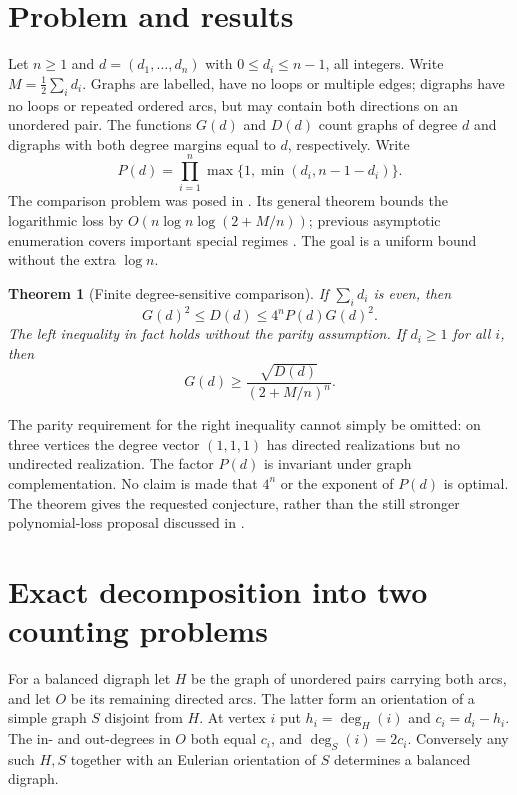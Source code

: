\documentclass[11pt]{article}
\newtheorem{theorem}{Theorem}
\theoremstyle{remark}\newtheorem{remark}[theorem]{Remark}
\begin{document}
\section{Problem and results}
Let $n\ge1$ and $d=(d_1,\ldots,d_n)$ with $0\le d_i\le n-1$, all integers. Write $M=\tfrac12\sum_i d_i$. Graphs are labelled, have no loops or multiple edges; digraphs have no loops or repeated ordered arcs, but may contain both directions on an unordered pair. The functions $G(d)$ and $D(d)$ count graphs of degree $d$ and digraphs with both degree margins equal to $d$, respectively. Write
\[
 P(d)=\prod_{i=1}^n\max\{1,\min(d_i,n-1-d_i)\}.
\]
The comparison problem was posed in \cite[Conjecture 1.1]{mehrdad26}. Its general theorem bounds the logarithmic loss by $O(n\log n\log(2+M/n))$; previous asymptotic enumeration covers important special regimes \cite{barvinokhartigan,liebenauwormald}. The goal is a uniform bound without the extra $\log n$.
\begin{theorem}[Finite degree-sensitive comparison]\label{thm:main}
If $\sum_i d_i$ is even, then
\begin{equation}\label{eq:main}
G(d)^2\le D(d)\le 4^nP(d)G(d)^2.
\end{equation}
The left inequality in fact holds without the parity assumption. If $d_i\ge1$ for all $i$, then
\begin{equation}\label{eq:conj}
G(d)\ge \frac{\sqrt{D(d)}}{(2+M/n)^n}.
\end{equation}
\end{theorem}
The parity requirement for the right inequality cannot simply be omitted: on three vertices the degree vector $(1,1,1)$ has directed realizations but no undirected realization. The factor $P(d)$ is invariant under graph complementation. No claim is made that $4^n$ or the exponent of $P(d)$ is optimal. The theorem gives the requested conjecture, rather than the still stronger polynomial-loss proposal discussed in \cite{mehrdad26}.

\section{Exact decomposition into two counting problems}
For a balanced digraph let $H$ be the graph of unordered pairs carrying both arcs, and let $O$ be its remaining directed arcs. The latter form an orientation of a simple graph $S$ disjoint from $H$. At vertex $i$ put $h_i=\deg_H(i)$ and $c_i=d_i-h_i$. The in- and out-degrees in $O$ both equal $c_i$, and $\deg_S(i)=2c_i$. Conversely any such $H,S$ together with an Eulerian orientation of $S$ determines a balanced digraph.
\end{document}
